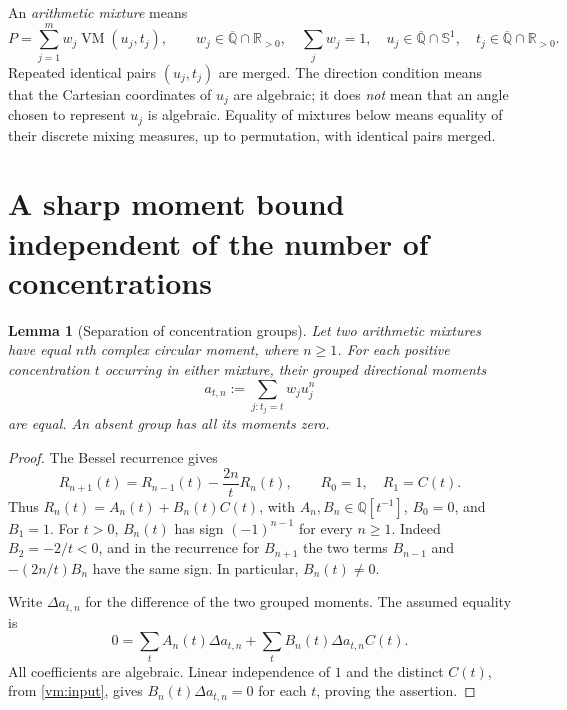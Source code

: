 \documentclass[11pt]{article}
\newtheorem{lemma}[theorem]{Lemma}
\theoremstyle{definition}
\theoremstyle{remark}
\newcommand{\kk}{\overline{\mathbb Q}}
\newcommand{\VM}{\operatorname{VM}}
\newcommand{\Sone}{\mathbb S^1}
\begin{document}
An \emph{arithmetic mixture} means
\begin{equation}\label{vm:mixture}
 P=\sum_{j=1}^{m}w_j\VM(u_j,t_j),\qquad
 w_j\in\kk\cap\mathbb R_{>0},\quad \sum_jw_j=1,
 \quad u_j\in\kk\cap\Sone,
 \quad t_j\in\kk\cap\mathbb R_{>0}.
\end{equation}
Repeated identical pairs $(u_j,t_j)$ are merged.  The direction condition
means that the Cartesian coordinates of $u_j$ are algebraic; it does
\emph{not} mean that an angle chosen to represent $u_j$ is algebraic.
Equality of mixtures below means equality of their discrete mixing
measures, up to permutation, with identical pairs merged.

\section{A sharp moment bound independent of the number of concentrations}

\begin{lemma}[Separation of concentration groups]\label{vm:separate}
Let two arithmetic mixtures have equal $n$th complex circular moment,
where $n\geq1$.  For each positive concentration $t$ occurring in either
mixture, their grouped directional moments
\[
 a_{t,n}:=\sum_{j:t_j=t}w_ju_j^n
\]
are equal.  An absent group has all its moments zero.
\end{lemma}
\begin{proof}
The Bessel recurrence gives
\[
 R_{n+1}(t)=R_{n-1}(t)-\frac{2n}{t}R_n(t),\qquad R_0=1,\quad R_1=C(t).
\]
Thus $R_n(t)=A_n(t)+B_n(t)C(t)$, with
$A_n,B_n\in\mathbb Q[t^{-1}]$, $B_0=0$, and $B_1=1$.
For $t>0$, $B_n(t)$ has sign $(-1)^{n-1}$ for every $n\geq1$.
Indeed $B_2=-2/t<0$, and in the recurrence for $B_{n+1}$ the two
terms $B_{n-1}$ and $-(2n/t)B_n$ have the same sign.  In particular,
$B_n(t)\ne0$.

Write $\Delta a_{t,n}$ for the difference of the two grouped moments.
The assumed equality is
\[
 0=\sum_t A_n(t)\Delta a_{t,n}
     +\sum_t B_n(t)\Delta a_{t,n}C(t).
\]
All coefficients are algebraic.  Linear independence of $1$ and the
distinct $C(t)$, from \eqref{vm:input}, gives
$B_n(t)\Delta a_{t,n}=0$ for each $t$, proving the assertion.
\end{proof}
\end{document}
